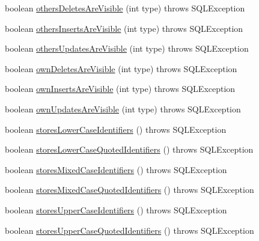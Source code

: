 \begin{DoxyCompactItemize}
\item 
boolean \mbox{\hyperlink{classcom_1_1mysql_1_1cj_1_1jdbc_1_1_database_meta_data_a056320917f222b8b7b13256755ef2ebd}{others\+Deletes\+Are\+Visible}} (int type)  throws S\+Q\+L\+Exception 
\item 
boolean \mbox{\hyperlink{classcom_1_1mysql_1_1cj_1_1jdbc_1_1_database_meta_data_a2cb84d63be00798e69df3b6cef77ee8c}{others\+Inserts\+Are\+Visible}} (int type)  throws S\+Q\+L\+Exception 
\item 
boolean \mbox{\hyperlink{classcom_1_1mysql_1_1cj_1_1jdbc_1_1_database_meta_data_ae11c9c0e5cce7a5f68ce7e0fd44060bc}{others\+Updates\+Are\+Visible}} (int type)  throws S\+Q\+L\+Exception 
\item 
boolean \mbox{\hyperlink{classcom_1_1mysql_1_1cj_1_1jdbc_1_1_database_meta_data_a15c484885887bce87e58e9d72cfec7dc}{own\+Deletes\+Are\+Visible}} (int type)  throws S\+Q\+L\+Exception 
\item 
boolean \mbox{\hyperlink{classcom_1_1mysql_1_1cj_1_1jdbc_1_1_database_meta_data_a4bef4c1a76186b8ad13e215477aa4089}{own\+Inserts\+Are\+Visible}} (int type)  throws S\+Q\+L\+Exception 
\item 
boolean \mbox{\hyperlink{classcom_1_1mysql_1_1cj_1_1jdbc_1_1_database_meta_data_ac71adb774c60d7558f9183001602b895}{own\+Updates\+Are\+Visible}} (int type)  throws S\+Q\+L\+Exception 
\item 
boolean \mbox{\hyperlink{classcom_1_1mysql_1_1cj_1_1jdbc_1_1_database_meta_data_a2acfc886d13080ef24bf330ac054b2d7}{stores\+Lower\+Case\+Identifiers}} ()  throws S\+Q\+L\+Exception 
\item 
boolean \mbox{\hyperlink{classcom_1_1mysql_1_1cj_1_1jdbc_1_1_database_meta_data_a484be93eb5a6791992652b8d954afa78}{stores\+Lower\+Case\+Quoted\+Identifiers}} ()  throws S\+Q\+L\+Exception 
\item 
boolean \mbox{\hyperlink{classcom_1_1mysql_1_1cj_1_1jdbc_1_1_database_meta_data_a742819e579d84cb1ade3dcadb16471ba}{stores\+Mixed\+Case\+Identifiers}} ()  throws S\+Q\+L\+Exception 
\item 
boolean \mbox{\hyperlink{classcom_1_1mysql_1_1cj_1_1jdbc_1_1_database_meta_data_ad2dec78819a06dcdaa0d9422c3a1714b}{stores\+Mixed\+Case\+Quoted\+Identifiers}} ()  throws S\+Q\+L\+Exception 
\item 
boolean \mbox{\hyperlink{classcom_1_1mysql_1_1cj_1_1jdbc_1_1_database_meta_data_a59d4e06d27f9b3fa1258f31c3727b806}{stores\+Upper\+Case\+Identifiers}} ()  throws S\+Q\+L\+Exception 
\item 
boolean \mbox{\hyperlink{classcom_1_1mysql_1_1cj_1_1jdbc_1_1_database_meta_data_a1fddd0ed7b45c4fd038d3d2177dbdfb4}{stores\+Upper\+Case\+Quoted\+Identifiers}} ()  throws S\+Q\+L\+Exception 

\end{DoxyCompactItemize}
